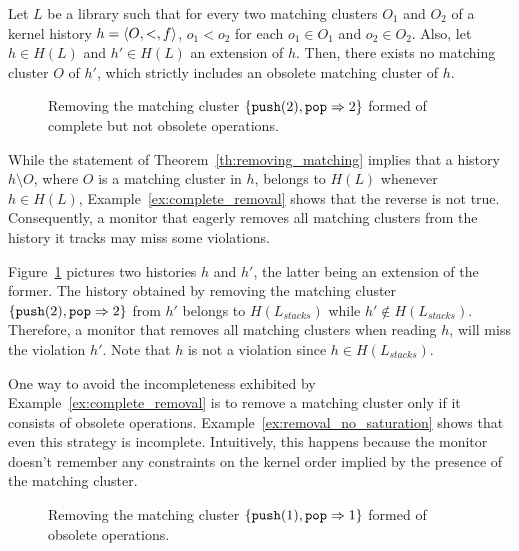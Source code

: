 \begin{lemma}

Let $L$ be a library such that for every two matching clusters $O_1$ and $O_2$ of a kernel history 
$h=\left\langle {O,<,f} \right\rangle$, $o_1<o_2$ for each $o_1\in O_1$ and $o_2\in O_2$. 
Also, let $h\in H(L)$ and $h'\in H(L)$ an extension of $h$. Then, there exists no matching cluster $O$ 
of $h'$, which strictly includes an obsolete matching cluster of $h$.

\end{lemma}

\begin{figure}



\caption{Removing the matching cluster $\{{\tt push}(2),{\tt pop}=>2\}$ formed of complete but not obsolete operations.}
\label{fig:complete_removal}

\end{figure}

While the statement of Theorem~\ref{th:removing_matching} implies that a history
$h\setminus O$, where $O$ is a matching cluster in $h$, belongs to $H(L)$ whenever $h\in H(L)$,
Example~\ref{ex:complete_removal} shows that the reverse is not true. Consequently, 
a monitor that eagerly removes all matching clusters from the history it tracks 
may miss some violations.

\begin{example}\label{ex:complete_removal}

Figure~\ref{fig:complete_removal} pictures two histories $h$ and $h'$, the latter being an
extension of the former. The history obtained by removing the 
matching cluster $\{{\tt push}(2),{\tt pop}=>2\}$ from $h'$ belongs to $H(L_{stacks})$ while
$h'\not\in H(L_{stacks})$. Therefore, a monitor that removes all 
matching clusters when reading $h$, will miss the violation $h'$. Note that $h$ is not
a violation since $h\in H(L_{stacks})$.

\end{example}

One way to avoid the incompleteness exhibited by Example~\ref{ex:complete_removal}
is to remove a matching cluster only if it consists of obsolete operations.
Example~\ref{ex:removal_no_saturation} shows that even this strategy is incomplete.
Intuitively, this happens because the monitor doesn't remember any constraints
on the kernel order implied by the presence of the matching cluster.

\begin{figure}



\caption{Removing the matching cluster $\{{\tt push}(1),{\tt pop}=>1\}$ formed of obsolete operations.}
\label{fig:removal_no_saturation}

\end{figure}

